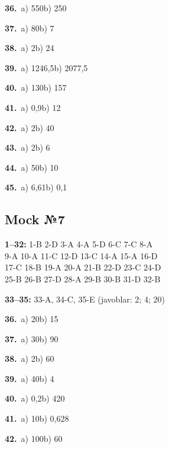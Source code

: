 \documentclass[11pt,a4paper]{article}
\begin{document}
\noindent\textbf{36.}\ a) 550\quad b) 250\par
\noindent\textbf{37.}\ a) 80\quad b) 7\par
\noindent\textbf{38.}\ a) 2\quad b) 24\par
\noindent\textbf{39.}\ a) 1246,5\quad b) 2077,5\par
\noindent\textbf{40.}\ a) 130\quad b) 157\par
\noindent\textbf{41.}\ a) 0,9\quad b) 12\par
\noindent\textbf{42.}\ a) 2\quad b) 40\par
\noindent\textbf{43.}\ a) 2\quad b) 6\par
\noindent\textbf{44.}\ a) 50\quad b) 10\par
\noindent\textbf{45.}\ a) 6,61\quad b) 0,1\par
{}\par\bigskip
{}\subsection*{Mock №7}
\noindent\textbf{1–32:} 1-B 2-D 3-A 4-A 5-D 6-C 7-C 8-A\\ 9-A 10-A 11-C 12-D 13-C 14-A 15-A 16-D\\ 17-C 18-B 19-A 20-A 21-B 22-D 23-C 24-D\\ 25-B 26-B 27-D 28-A 29-B 30-B 31-D 32-B\par
\noindent\textbf{33–35:} 33-A, 34-C, 35-E \quad (javoblar: 2; 4; 20)\par
\noindent\textbf{36.}\ a) 20\quad b) 15\par
\noindent\textbf{37.}\ a) 30\quad b) 90\par
\noindent\textbf{38.}\ a) 2\quad b) 60\par
\noindent\textbf{39.}\ a) 40\quad b) 4\par
\noindent\textbf{40.}\ a) 0,2\quad b) 420\par
\noindent\textbf{41.}\ a) 10\quad b) 0,628\par
\noindent\textbf{42.}\ a) 100\quad b) 60\par
\end{document}
